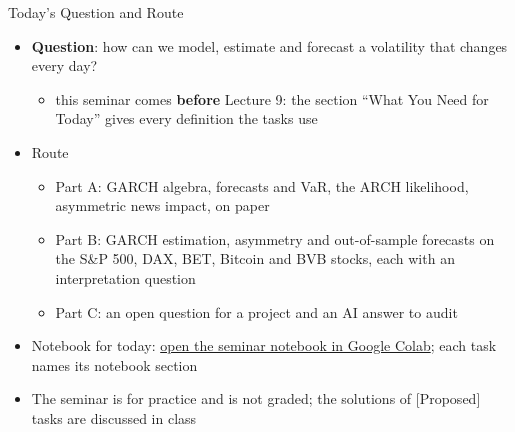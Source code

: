 \begin{frame}{Today's Question and Route}
\itemsize{\small}
\begin{itemize}
    \item \textbf{Question}: how can we model, estimate and forecast a volatility that changes every day?
    \begin{itemize}
        \item this seminar comes \textbf{before} Lecture 9: the section ``What You Need for Today'' gives every definition the tasks use
    \end{itemize}
    \item Route
    \begin{itemize}
        \item Part A: GARCH algebra, forecasts and VaR, the ARCH likelihood, asymmetric news impact, on paper
        \item Part B: GARCH estimation, asymmetry and out-of-sample forecasts on the S\&P 500, DAX, BET, Bitcoin and BVB stocks, each with an interpretation question
        \item Part C: an open question for a project and an AI answer to audit
    \end{itemize}
    \item Notebook for today: \href{\nb}{open the seminar notebook in Google Colab}; each task names its notebook section
    \item The seminar is for practice and is not graded; the solutions of [Proposed] tasks are discussed in class
\end{itemize}
\end{frame}

